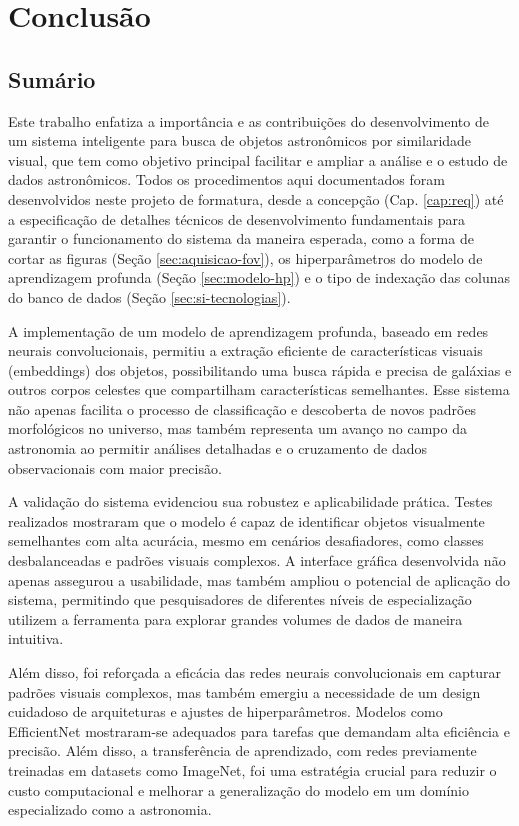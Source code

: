 \chapter{Conclusão}
\label{cap:conclusao}


\section{Sumário}
Este trabalho enfatiza a importância e as contribuições do desenvolvimento de um sistema inteligente para busca de objetos astronômicos por similaridade visual, que tem como objetivo principal facilitar e ampliar a análise e o estudo de dados astronômicos. Todos os procedimentos aqui documentados foram desenvolvidos neste projeto de formatura, desde a concepção (Cap. \ref{cap:req}) até a especificação de detalhes técnicos de desenvolvimento fundamentais para garantir o funcionamento do sistema da maneira esperada, como a forma de cortar as figuras (Seção \ref{sec:aquisicao-fov}), os hiperparâmetros do modelo de aprendizagem profunda (Seção \ref{sec:modelo-hp}) e o tipo de indexação das colunas do banco de dados (Seção \ref{sec:si-tecnologias}).

A implementação de um modelo de aprendizagem profunda, baseado em redes neurais convolucionais, permitiu a extração eficiente de características visuais (embeddings) dos objetos, possibilitando uma busca rápida e precisa de galáxias e outros corpos celestes que compartilham características semelhantes. Esse sistema não apenas facilita o processo de classificação e descoberta de novos padrões morfológicos no universo, mas também representa um avanço no campo da astronomia ao permitir análises detalhadas e o cruzamento de dados observacionais com maior precisão.

A validação do sistema evidenciou sua robustez e aplicabilidade prática. Testes realizados  mostraram que o modelo é capaz de identificar objetos visualmente semelhantes com alta acurácia, mesmo em cenários desafiadores, como classes desbalanceadas e padrões visuais complexos. A interface gráfica desenvolvida não apenas assegurou a usabilidade, mas também ampliou o potencial de aplicação do sistema, permitindo que pesquisadores de diferentes níveis de especialização utilizem a ferramenta para explorar grandes volumes de dados de maneira intuitiva.

Além disso, foi reforçada a eficácia das redes neurais convolucionais em capturar padrões visuais complexos, mas também emergiu a necessidade de um design cuidadoso de arquiteturas e ajustes de hiperparâmetros. Modelos como EfficientNet mostraram-se adequados para tarefas que demandam alta eficiência e precisão. Além disso, a transferência de aprendizado, com redes previamente treinadas em datasets como ImageNet, foi uma estratégia crucial para reduzir o custo computacional e melhorar a generalização do modelo em um domínio especializado como a astronomia.

